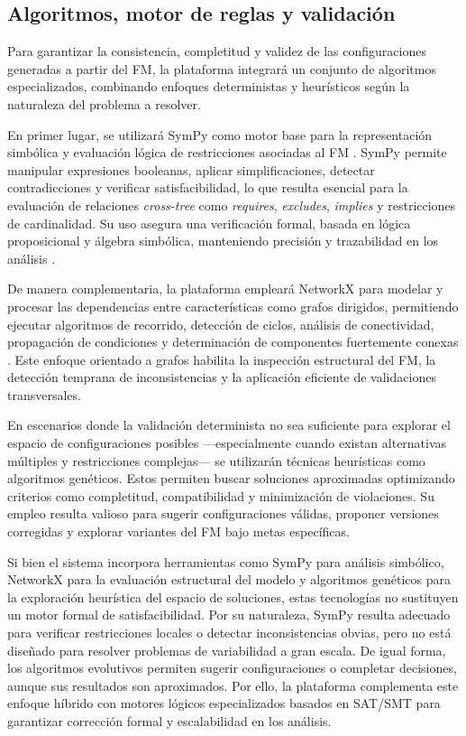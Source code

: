 \subsection{Algoritmos, motor de reglas y validación}

Para garantizar la consistencia, completitud y validez de las configuraciones
generadas a partir del \ac{FM}, la plataforma integrará
un conjunto de algoritmos especializados, combinando enfoques deterministas y
heurísticos según la naturaleza del problema a resolver. 

En primer lugar, se utilizará SymPy como motor base para la
representación simbólica y evaluación lógica de restricciones asociadas al \ac{FM} 
\citep{meurer2017sympy}.
SymPy permite manipular expresiones booleanas, aplicar simplificaciones,
detectar contradicciones y verificar satisfacibilidad, lo que resulta esencial
para la evaluación de relaciones \textit{cross-tree} como \textit{requires},
\textit{excludes}, \textit{implies} y restricciones de cardinalidad. Su uso
asegura una verificación formal, basada en lógica proposicional y álgebra
simbólica, manteniendo precisión y trazabilidad en los análisis \citep{meurer2017sympy}.

De manera complementaria, la plataforma empleará NetworkX para
modelar y procesar las dependencias entre características como grafos
dirigidos, permitiendo ejecutar algoritmos de recorrido, detección de ciclos,
análisis de conectividad, propagación de condiciones y determinación de
componentes fuertemente conexas \citep{hagberg2008networkx}. Este enfoque orientado a grafos habilita la
inspección estructural del \ac{FM}, la detección temprana de inconsistencias y la
aplicación eficiente de validaciones transversales.

En escenarios donde la validación determinista no sea suficiente para explorar
el espacio de configuraciones posibles —especialmente cuando existan
alternativas múltiples y restricciones complejas— se utilizarán técnicas
heurísticas como algoritmos genéticos. Estos permiten buscar
soluciones aproximadas optimizando criterios como completitud, compatibilidad
y minimización de violaciones. Su empleo resulta valioso para sugerir
configuraciones válidas, proponer versiones corregidas y explorar variantes
del \ac{FM} bajo metas específicas.

Si bien el sistema incorpora herramientas como SymPy para análisis 
simbólico, NetworkX para la evaluación estructural del modelo y 
algoritmos genéticos para la exploración heurística del espacio de 
soluciones, estas tecnologías no sustituyen un motor formal de 
satisfacibilidad. Por su naturaleza, SymPy resulta adecuado para 
verificar restricciones locales o detectar inconsistencias obvias, 
pero no está diseñado para resolver problemas de variabilidad a gran 
escala. De igual forma, los algoritmos evolutivos permiten sugerir 
configuraciones o completar decisiones, aunque sus resultados son 
aproximados. Por ello, la plataforma complementa este enfoque híbrido 
con motores lógicos especializados basados en \ac{SAT}/\ac{SMT} para garantizar 
corrección formal y escalabilidad en los análisis.

